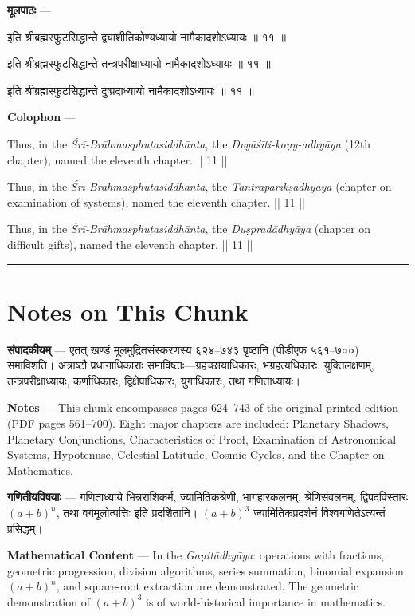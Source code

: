 \documentclass[11pt,a4paper]{article}
\newcommand{\skt}[1]{{\devanagarifont\color{sktcolor} #1}}
\newenvironment{bilingual}{%
  \par\noindent
  \begin{minipage}[t]{0.47\textwidth}%
}{%
  \par\end{minipage}%
}
\newcommand{\rightcol}{%
  \par\end{minipage}%
  \hfill
  \begin{minipage}[t]{0.47\textwidth}%
}
\begin{document}
\begin{bilingual}
\textbf{मूलपाठः} ---

\skt{इति श्रीब्रह्मस्फुटसिद्धान्ते द्व्याशीतिकोण्यध्यायो नामैकादशोऽध्यायः ॥ ११ ॥}

\skt{इति श्रीब्रह्मस्फुटसिद्धान्ते तन्त्रपरीक्षाध्यायो नामैकादशोऽध्यायः ॥ ११ ॥}

\skt{इति श्रीब्रह्मस्फुटसिद्धान्ते दुष्प्रदाध्यायो नामैकादशोऽध्यायः ॥ ११ ॥}
\rightcol
\textbf{Colophon} ---

Thus, in the \textit{Śrī-Brāhmasphuṭasiddhānta}, the \textit{Dvyāśīti-koṇy-adhyāya} (12th chapter), named the eleventh chapter. || 11 ||

Thus, in the \textit{Śrī-Brāhmasphuṭasiddhānta}, the \textit{Tantraparīkṣādhyāya} (chapter on examination of systems), named the eleventh chapter. || 11 ||

Thus, in the \textit{Śrī-Brāhmasphuṭasiddhānta}, the \textit{Duṣpradādhyāya} (chapter on difficult gifts), named the eleventh chapter. || 11 ||
\end{bilingual}

\medskip
\noindent\rule{\textwidth}{0.4pt}

\section*{Notes on This Chunk}

\begin{bilingual}
\textbf{संपादकीयम्} --- एतत् खण्डं मूलमुद्रितसंस्करणस्य ६२४--७४३ पृष्ठानि (पीडीएफ ५६१--७००) समाविशति। अत्राष्टौ प्रधानाधिकाराः समाविष्टाः---ग्रहच्छायाधिकारः, भग्रहत्यधिकारः, युक्तिलक्षणम्, तन्त्रपरीक्षाध्यायः, कर्णाधिकारः, द्विक्षेपाधिकारः, युगाधिकारः, तथा गणिताध्यायः।
\rightcol
\textbf{Notes} --- This chunk encompasses pages 624--743 of the original printed edition (PDF pages 561--700). Eight major chapters are included: Planetary Shadows, Planetary Conjunctions, Characteristics of Proof, Examination of Astronomical Systems, Hypotenuse, Celestial Latitude, Cosmic Cycles, and the Chapter on Mathematics.
\end{bilingual}

\medskip

\begin{bilingual}
\textbf{गणितीयविषयाः} --- गणिताध्याये भिन्नराशिकर्म, ज्यामितिकश्रेणी, भागहारकलनम्, श्रेणिसंवलनम्, द्विपदविस्तारः $(a+b)^n$, तथा वर्गमूलोत्पत्तिः इति प्रदर्शितानि। $(a+b)^3$ ज्यामितिकप्रदर्शनं विश्वगणितेऽत्यन्तं प्रसिद्धम्।
\rightcol
\textbf{Mathematical Content} --- In the \textit{Gaṇitādhyāya}: operations with fractions, geometric progression, division algorithms, series summation, binomial expansion $(a+b)^n$, and square-root extraction are demonstrated. The geometric demonstration of $(a+b)^3$ is of world-historical importance in mathematics.
\end{bilingual}
\end{document}
